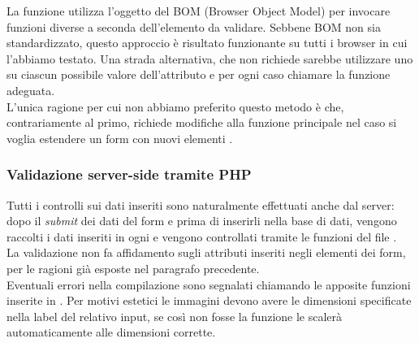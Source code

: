 \documentclass[12pt]{article}
\begin{document}
	La funzione  utilizza l'oggetto  del BOM (Browser Object Model) per invocare funzioni diverse a seconda dell'elemento da validare. Sebbene BOM non sia standardizzato, questo approccio è risultato funzionante su tutti i browser in cui l'abbiamo testato. Una strada alternativa, che non richiede  sarebbe utilizzare uno  su ciascun possibile valore dell'attributo  e per ogni caso chiamare la funzione adeguata.\\ L'unica ragione per cui non abbiamo preferito questo metodo è che, contrariamente al primo, richiede modifiche alla funzione principale  nel caso si voglia estendere un form con nuovi elementi . 
	
	\subsubsection*{Validazione server-side tramite PHP}
	Tutti i controlli sui dati inseriti sono naturalmente effettuati anche dal server: dopo il \textit{submit} dei dati del form e prima di inserirli nella base di dati, vengono raccolti i dati inseriti in ogni  e vengono controllati tramite le funzioni del file . \\
	La validazione non fa affidamento sugli attributi inseriti negli elementi dei form, per le ragioni già esposte nel paragrafo precedente.\\
	Eventuali errori nella compilazione sono segnalati chiamando le apposite funzioni inserite in . Per motivi estetici le immagini devono avere le dimensioni specificate nella label del relativo input, se così non fosse la funzione  le scalerà automaticamente alle dimensioni corrette.

	
\end{document}
